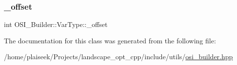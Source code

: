 \subsubsection{\texorpdfstring{\+\_\+offset}{\_offset}}
{\footnotesize\ttfamily int O\+S\+I\+\_\+\+Builder\+::\+Var\+Type\+::\+\_\+offset\hspace{0.3cm}{\ttfamily [protected]}}



The documentation for this class was generated from the following file\+:\begin{DoxyCompactItemize}
\item 
/home/plaiseek/\+Projects/landscape\+\_\+opt\+\_\+cpp/include/utils/\hyperlink{osi__builder_8hpp}{osi\+\_\+builder.\+hpp}\end{DoxyCompactItemize}
